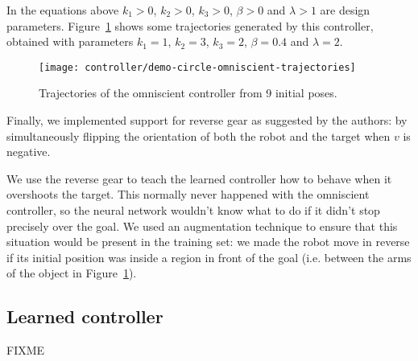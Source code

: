 In the equations above $k_1 > 0$, $k_2 > 0$, $k_3 > 0$, $\beta > 0$ and $\lambda > 1$ are design parameters. Figure~\ref{fig:omniscient-trajectories} shows some trajectories generated by this controller, obtained with parameters $k_1 = 1$, $k_2 = 3$, $k_3 = 2$, $\beta = 0.4$ and $\lambda = 2$.

\begin{figure}[htbp]
	\centerline{\texttt{[image: controller/demo-circle-omniscient-trajectories]}}
	\caption{Trajectories of the omniscient controller from 9 initial poses.}
	\label{fig:omniscient-trajectories}
\end{figure}

Finally, we implemented support for reverse gear as suggested by the authors: by simultaneously flipping the orientation of both the robot and the target when $v$ is negative. 

We use the reverse gear to teach the learned controller how to behave when it overshoots the target. This normally never happened with the omniscient controller, so the neural network wouldn't know what to do if it didn't stop precisely over the goal. We used an augmentation technique to ensure that this situation would be present in the training set: we made the robot move in reverse if its initial position was inside a region in front of the goal (i.e. between the arms of the object in Figure~\ref{fig:omniscient-trajectories}).

\subsection{Learned controller}

FIXME
